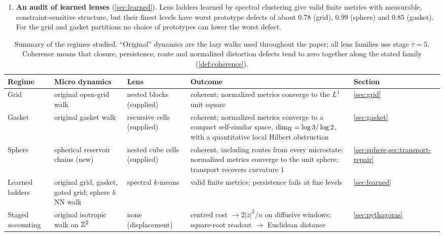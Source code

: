 \begin{enumerate}[leftmargin=*]
Hence the readout $\sqrt{F_n(z)/2}$ converges uniformly to the Euclidean length $|z|/\sqrt n$ in diffusive units, and the coordinate-axis Pythagorean residual vanishes.
A matched walk with correlated steps keeps a quadratic cost, but at the diagonal displacement $x=y=\lfloor\sqrt n\rfloor$ its axis residual tends to $-16/5$.
\item \textbf{An audit of learned lenses} (\cref{sec:learned}).
Lens ladders learned by spectral clustering give valid finite metrics with measurable, constraint-sensitive structure, but their finest levels have worst prototype defects of about $0.78$ (grid), $0.99$ (sphere) and $0.85$ (gasket).
For the grid and gasket partitions no choice of prototypes can lower the worst defect.
\end{enumerate}

\begin{table}[t]
\centering
\small
\caption{Summary of the regimes studied. ``Original'' dynamics are the lazy walks used throughout the paper; all lens families use stage $\tau=5$. Coherence means that closure, persistence, route and normalized distortion defects tend to zero together along the stated family (\cref{def:coherence}).}
\label{tab:summary}
\begin{tabularx}{\textwidth}{@{}>{\raggedright\arraybackslash}p{}>{\raggedright\arraybackslash}p{}>{\raggedright\arraybackslash}p{}>{\raggedright\arraybackslash}X>{\raggedright\arraybackslash}p{}@{}}
\toprule
Regime & Micro dynamics & Lens & Outcome & Section \\
\midrule
Grid & original open-grid walk & nested blocks (supplied) & coherent; normalized metrics converge to the $L^1$ unit square & \cref{sec:grid} \\
Gasket & original gasket walk & recursive cells (supplied) & coherent; normalized metrics converge to a compact self-similar space, $\dim_{\mathrm{H}}=\log 3/\log 2$, with a quantitative local Hilbert obstruction & \cref{sec:gasket} \\
Sphere & spherical reservoir chains (new) & nested cube cells (supplied) & coherent, including routes from every microstate; normalized metrics converge to the unit sphere; transport recovers curvature $1$ & \cref{sec:sphere,sec:transport-repair} \\
Learned ladders & original grid, gasket, gated grid; sphere $k$NN walk & spectral $k$-means & valid finite metrics; persistence fails at fine levels & \cref{sec:learned} \\
Staged accounting & original isotropic walk on $\mathbb{Z}^2$ & none (displacement) & centred cost $\to2|z|^2/n$ on diffusive windows; square-root readout $\to$ Euclidean distance & \cref{sec:pythagoras} \\
\bottomrule
\end{tabularx}
\end{table}

